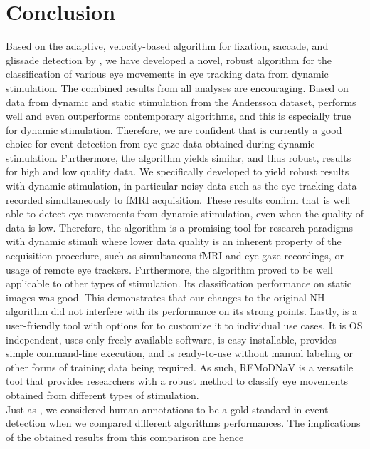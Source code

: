     \section*{Conclusion}\label{con}
    Based on the adaptive, velocity-based algorithm for fixation, saccade, and
    glissade detection by \cite{Nystrom2010AnData}, we have developed a novel,
    robust algorithm for the classification of various eye movements in eye tracking
    data from dynamic stimulation.
    The combined results from all analyses are encouraging. Based on data from dynamic and static stimulation from the
    Andersson dataset, \remodnav performs well and even outperforms contemporary algorithms, and this is especially true
    for dynamic stimulation. Therefore, we are confident
    that \remodnav is currently a good choice for event detection from eye gaze data obtained during dynamic stimulation.
    Furthermore, the algorithm yields similar, and thus robust, results for high and low quality data. We specifically
    developed \remodnav to yield robust results with dynamic stimulation, in particular noisy data such as the eye
    tracking data recorded simultaneously to fMRI acquisition. These results confirm that \remodnav is well able to detect
    eye movements from dynamic stimulation, even when the quality of data is low. Therefore, the algorithm is a promising
    tool for research paradigms with dynamic stimuli where lower data quality is an inherent property of the acquisition
    procedure, such as simultaneous fMRI and eye gaze recordings, or usage of remote eye trackers.
    Furthermore, the algorithm proved to be well applicable to other types of stimulation. Its classification
    performance on static images was good. This demonstrates that our changes to the original NH algorithm did not
    interfere with its performance on its strong points. Lastly, \remodnav is a user-friendly tool with options for
    to customize it to individual use cases. It is OS independent, uses only freely available software, is easy
    installable, provides simple command-line execution, and is ready-to-use without manual labeling or other forms
    of training data being required. As such, REMoDNaV is a versatile tool that provides researchers with a robust
    method to classify eye movements obtained from different types of stimulation. \\
    Just as \cite{Andersson2017}, we considered human annotations to be a gold standard in event detection when we
    compared different algorithms performances. The implications of the obtained results from this comparison are hence

